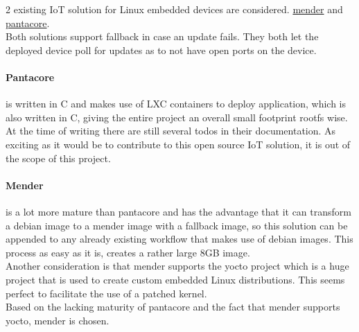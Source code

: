 \documentclass[../../main.tex]{subfiles}
\begin{document}
2 existing IoT solution for Linux embedded devices are considered.
\href{mender.io}{mender} and \href{pantahub.com}{pantacore}.\\

Both solutions support fallback in case an update fails.
They both let the deployed device poll for updates as to not have open ports on the device.

\paragraph{Pantacore}%
\label{par:pantacore}

is written in C and makes use of LXC containers to deploy application, which is also written in C,
giving the entire project an overall small footprint rootfs wise.\\
At the time of writing there are still several todos in their documentation. As exciting as it
would be to contribute to this open source IoT solution, it is out of the scope of this project.


\paragraph{Mender}%
\label{par:mender}

is a lot more mature than pantacore and has the advantage that it can transform a debian image
to a mender image with a fallback image, so this solution can be appended to any already 
existing workflow that makes use of debian images. This process as easy as it is, creates a
rather large 8GB image.\\

Another consideration is that mender supports the yocto project which is a huge project that is
used to create custom embedded Linux distributions. This seems perfect to facilitate the use of
a patched kernel.\\

Based on the lacking maturity of pantacore and the fact that mender supports yocto, mender is
chosen.
\end{document}
